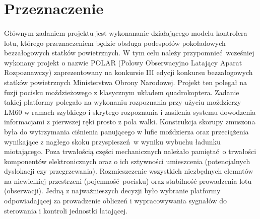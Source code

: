 \section{Przeznaczenie}
\paragraph{}Głównym zadaniem projektu jest wykonananie działającego modelu kontrolera lotu, którego przeznaczeniem będzie obsługa podespołów pokoładowych bezzałogowych statków powietrznych. W tym celu należy przypomnieć wcześniej wykonany projekt o nazwie POLAR (Polowy Obserwacyjno Latający Aparat Rozpoznawczy) zaprezentowany na konkursie III edycji konkursu bezzałogowych statków powietrznych Ministerstwa Obrony Narodowej. Projekt ten polegał na fuzji pocisku moździeżowego z klasycznym układem quadrokoptera. Zadanie takiej platformy polegało na wykonaniu rozpoznania przy użyciu moździerzy LM60 w ramach szybkiego i skrytego rozpoznania i zasilenia systemu dowodzenia informacjami z pierwszej ręki prosto z pola walki. Konstrukcja skorupy zmuszona była do wytrzymania ciśnienia panującego w lufie moździerza oraz przeciążenia wynikające z nagłego skoku przyspieszeń w wyniku wybuchu ładunku miotającego. Poza trwałością części mechanicznych należało pamiętać o trwałości komponentów elektronicznych oraz o ich sztywności umieszcenia (potencjalnych dyslokacji czy przegrzewania). Rozmieszczenie wszystkich niezbędnych elemntów na niewielkiej przestrzeni (pojemność pocisku) oraz stabilność prowadzenia lotu (obserwacji). Jedną z najważnieszych decyzji było wybranie platformy odpowiadającej za prowadzenie obliczeń i wypracowywania sygnałów do sterowania i kontroli jednostki latającej.
